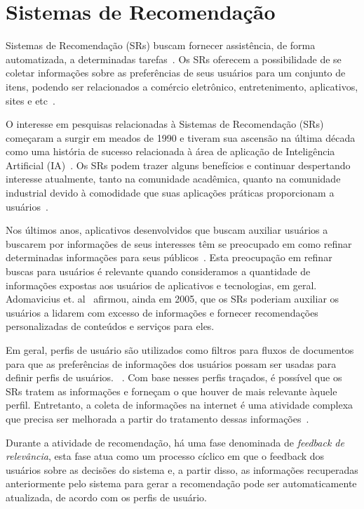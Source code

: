 \section{Sistemas de Recomendação}
\label{sec:sistemas}

Sistemas de Recomendação (SRs) buscam fornecer assistência, de forma automatizada, a determinadas tarefas~\cite{adomavicius2005toward}. Os SRs oferecem a possibilidade de se coletar informações sobre as preferências
de seus usuários para um conjunto de itens, podendo ser relacionados a comércio eletrônico, entretenimento, aplicativos, sites e etc~\cite{bobadilla2013recommender}.

O interesse em pesquisas relacionadas à Sistemas de Recomendação (SRs) começaram a surgir em meados de 1990 e tiveram sua ascensão na última década como uma história de sucesso relacionada à área de aplicação de Inteligência Artificial (IA)~\cite{felfernig2008constraint}.  Os SRs podem trazer alguns benefícios e continuar despertando interesse atualmente, tanto na comunidade acadêmica, quanto na comunidade industrial devido à comodidade que suas aplicações práticas proporcionam a usuários~\cite{champiri2015systematic}. 

Nos últimos anos, aplicativos desenvolvidos que buscam auxiliar usuários a buscarem por informações de seus interesses têm se preocupado em como refinar determinadas informações para seus públicos~\cite{adomavicius2005toward}. Esta preocupação em refinar buscas para usuários é relevante quando consideramos a quantidade de informações expostas aos usuários de aplicativos e tecnologias, em geral. Adomavicius et. al~\cite{adomavicius2005toward} afirmou, ainda em 2005, que os SRs poderiam auxiliar os usuários a lidarem com excesso de informações e fornecer recomendações personalizadas de conteúdos e serviços para eles.

Em geral, perfis de usuário são utilizados como filtros para fluxos de documentos para que as preferências de informações dos usuários possam ser usadas para definir perfis de usuários. ~\cite{burke2007hybrid}. Com base nesses perfis traçados, é possível que os SRs tratem as informações e forneçam o que houver de mais relevante àquele perfil. Entretanto, a coleta de informações na internet é uma atividade complexa que precisa ser melhorada a partir do tratamento dessas informações~\cite{porcel2010dealing}.

Durante a atividade de recomendação, há uma fase denominada de \textit{feedback de relevância}, esta fase atua como um processo cíclico em que o feedback dos usuários sobre as decisões do sistema e, a partir disso, as informações recuperadas anteriormente pelo sistema para gerar a recomendação pode ser automaticamente atualizada, de acordo com os perfis de usuário\cite{porcel2010dealing}.

